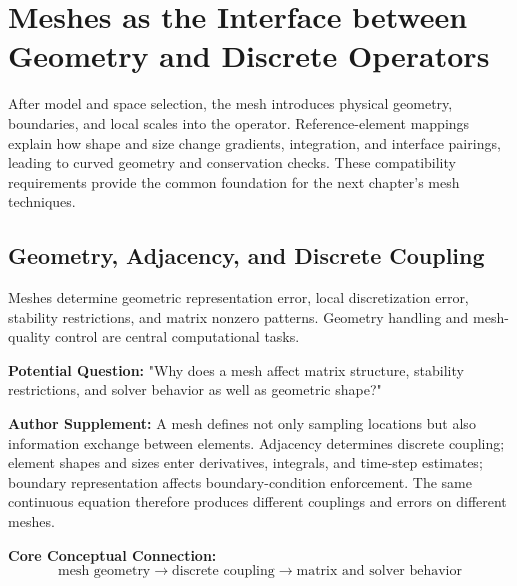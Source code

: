 \chapter{Meshes as the Interface between Geometry and Discrete Operators}\label{ch:20}
\begin{chaptersummary}
After model and space selection, the mesh introduces physical geometry, boundaries, and local scales into the operator. Reference-element mappings explain how shape and size change gradients, integration, and interface pairings, leading to curved geometry and conservation checks. These compatibility requirements provide the common foundation for the next chapter's mesh techniques.
\end{chaptersummary}
\section{Geometry, Adjacency, and Discrete Coupling}
Meshes determine geometric representation error, local discretization error, stability restrictions, and matrix nonzero patterns. Geometry handling and mesh-quality control are central computational tasks.

\begin{authornote}
\textbf{Potential Question:}
"Why does a mesh affect matrix structure, stability restrictions, and solver behavior as well as geometric shape?"

\textbf{Author Supplement:}
A mesh defines not only sampling locations but also information exchange between elements. Adjacency determines discrete coupling; element shapes and sizes enter derivatives, integrals, and time-step estimates; boundary representation affects boundary-condition enforcement. The same continuous equation therefore produces different couplings and errors on different meshes.

\textbf{Core Conceptual Connection:}
\[
\text{mesh geometry}
\longrightarrow
\text{discrete coupling}
\longrightarrow
\text{matrix and solver behavior}
\]
\end{authornote}

